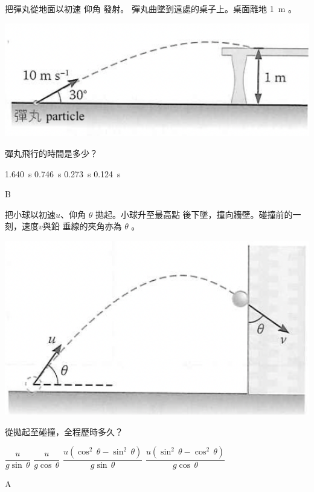 {
    把彈丸從地面以初速  仰角  發射。 彈丸曲墜到遠處的桌子上。桌面離地 \qty{1}{m} 。\bigskip
    {\par\centering
        \includegraphics[width=.4\textwidth]{assets/0c28069a.png}
        \par}\bigskip
    彈丸飛行的時間是多少？
    \begin{tasks}
        \task \qty{1.640}{s}
        \task \qty{0.746}{s}
        \task \qty{0.273}{s}
        \task \qty{0.124}{s}
    \end{tasks}
}{B}

{
    把小球以初速$u$、仰角 $\theta$ 拋起。小球升至最高點 後下墜，撞向牆壁。碰撞前的一刻，速度$v$與鉛 垂線的夾角亦為 $\theta$ 。\bigskip
    {\par\centering
        \includegraphics[width=.4\textwidth]{assets/7eb2fb07.png}
        \par}\bigskip
    從拋起至碰撞，全程歷時多久？
    \begin{tasks}
        \task $\dfrac{u}{g\sin\,\theta}$
        \task $\dfrac{u}{g\cos\,\theta}$
        \task $\dfrac{u(\cos^2\,\theta-\sin^2\,\theta)}{g\sin\,\theta}$
        \task $\dfrac{u(\sin^2\,\theta-\cos^2\,\theta)}{g\cos\,\theta}$
    \end{tasks}
}{A}

